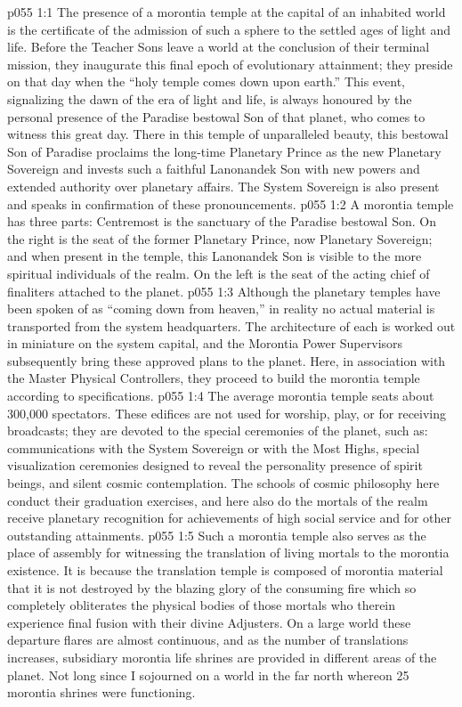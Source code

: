 \vs p055 1:1 The presence of a morontia temple at the capital of an inhabited world is the certificate of the admission of such a sphere to the settled ages of light and life. Before the Teacher Sons leave a world at the conclusion of their terminal mission, they inaugurate this final epoch of evolutionary attainment; they preside on that day when the “holy temple comes down upon earth.” This event, signalizing the dawn of the era of light and life, is always honoured by the personal presence of the Paradise bestowal Son of that planet, who comes to witness this great day. There in this temple of unparalleled beauty, this bestowal Son of Paradise proclaims the long\hyp{}time Planetary Prince as the new Planetary Sovereign and invests such a faithful Lanonandek Son with new powers and extended authority over planetary affairs. The System Sovereign is also present and speaks in confirmation of these pronouncements.
\vs p055 1:2 A morontia temple has three parts: Centremost is the sanctuary of the Paradise bestowal Son. On the right is the seat of the former Planetary Prince, now Planetary Sovereign; and when present in the temple, this Lanonandek Son is visible to the more spiritual individuals of the realm. On the left is the seat of the acting chief of finaliters attached to the planet.
\vs p055 1:3 \pc Although the planetary temples have been spoken of as “coming down from heaven,” in reality no actual material is transported from the system headquarters. The architecture of each is worked out in miniature on the system capital, and the Morontia Power Supervisors subsequently bring these approved plans to the planet. Here, in association with the Master Physical Controllers, they proceed to build the morontia temple according to specifications.
\vs p055 1:4 \pc The average morontia temple seats about 300,000 spectators. These edifices are not used for worship, play, or for receiving broadcasts; they are devoted to the special ceremonies of the planet, such as: communications with the System Sovereign or with the Most Highs, special visualization ceremonies designed to reveal the personality presence of spirit beings, and silent cosmic contemplation. The schools of cosmic philosophy here conduct their graduation exercises, and here also do the mortals of the realm receive planetary recognition for achievements of high social service and for other outstanding attainments.
\vs p055 1:5 Such a morontia temple also serves as the place of assembly for witnessing the translation of living mortals to the morontia existence. It is because the translation temple is composed of morontia material that it is not destroyed by the blazing glory of the consuming fire which so completely obliterates the physical bodies of those mortals who therein experience final fusion with their divine Adjusters. On a large world these departure flares are almost continuous, and as the number of translations increases, subsidiary morontia life shrines are provided in different areas of the planet. Not long since I sojourned on a world in the far north whereon 25 morontia shrines were functioning.
